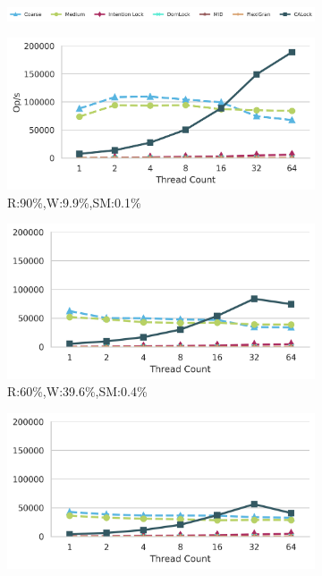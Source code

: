 \begin{figure}[h]
	\centering
	\captionsetup{justification=centering}
		\begin{subfigure}[b]{\textwidth}
			\centering
			\includegraphics[width=\textwidth]{figures/PerformanceCharts/Legend}
		\end{subfigure}
		\begin{subfigure}[b]{.33\textwidth}
			\includegraphics[width=\textwidth]{figures/PerformanceCharts/ReadWithModificationsThroughput}
			\caption{R:90\%,W:9.9\%,SM:0.1\%}
			\label{rm}
		\end{subfigure}
		\begin{subfigure}[b]{.325\textwidth}
			\includegraphics[width=\textwidth]{figures/PerformanceCharts/BalancedWithModificationsThroughput}
			\caption{R:60\%,W:39.6\%,SM:0.4\%}
			\label{bm}
		\end{subfigure}
		\begin{subfigure}[b]{.325\textwidth}
			\includegraphics[width=\textwidth]{figures/PerformanceCharts/WriteWithModificationsThroughput}

\end{subfigure}
\end{figure}
